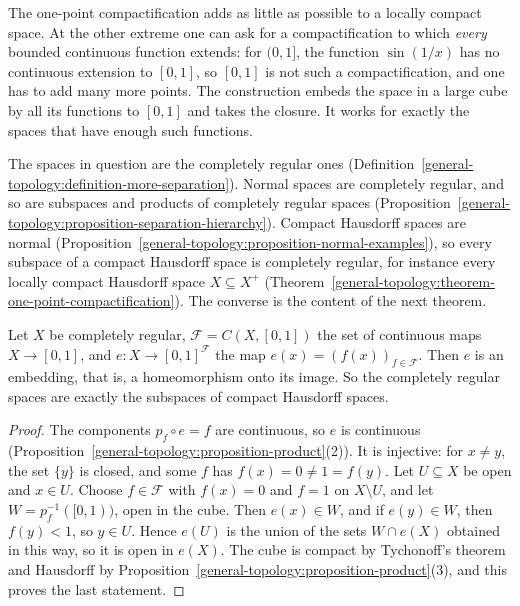 The one-point compactification adds as little as possible to a locally compact space. At the other extreme one can ask for a compactification to which \emph{every} bounded continuous function
extends: for $(0, 1]$, the function $\sin(1/x)$ has no continuous extension to $[0, 1]$, so $[0, 1]$ is not such a compactification, and one has to add many more points. The construction embeds the space in
a large cube by all its functions to $[0, 1]$ and takes the closure. It works for exactly the spaces that have enough such functions.

The spaces in question are the completely regular ones (Definition~\ref{general-topology:definition-more-separation}). Normal spaces are completely regular, and so are subspaces and products of completely
regular spaces (Proposition~\ref{general-topology:proposition-separation-hierarchy}). Compact Hausdorff spaces are normal (Proposition~\ref{general-topology:proposition-normal-examples}), so every subspace of
a compact Hausdorff space is completely regular, for instance every locally compact Hausdorff space $X \subseteq X^+$ (Theorem~\ref{general-topology:theorem-one-point-compactification}). The converse is the
content of the next theorem.

\begin{theorem}\label{general-topology:theorem-cube-embedding}
Let $X$ be completely regular, $\mathcal{F} = C(X, [0, 1])$ the set of continuous maps $X \to [0, 1]$, and $e \colon X \to [0, 1]^{\mathcal{F}}$ the map $e(x) = (f(x))_{f \in \mathcal{F}}$. Then $e$ is an
embedding, that is, a homeomorphism onto its image. So the completely regular spaces are exactly the subspaces of compact Hausdorff spaces.
\end{theorem}

\begin{proof}
The components $p_f \circ e = f$ are continuous, so $e$ is continuous (Proposition~\ref{general-topology:proposition-product}(2)). It is injective: for $x \neq y$, the set $\{y\}$ is closed, and some $f$ has
$f(x) = 0 \neq 1 = f(y)$. Let $U \subseteq X$ be open and $x \in U$. Choose $f \in \mathcal{F}$ with $f(x) = 0$ and $f = 1$ on $X \setminus U$, and let $W = p_f^{-1}([0, 1))$, open in the cube. Then $e(x) \in W$,
and if $e(y) \in W$, then $f(y) < 1$, so $y \in U$. Hence $e(U)$ is the union of the sets $W \cap e(X)$ obtained in this way, so it is open in $e(X)$. The cube is compact by Tychonoff's theorem and Hausdorff
by Proposition~\ref{general-topology:proposition-product}(3), and this proves the last statement.
\end{proof}

